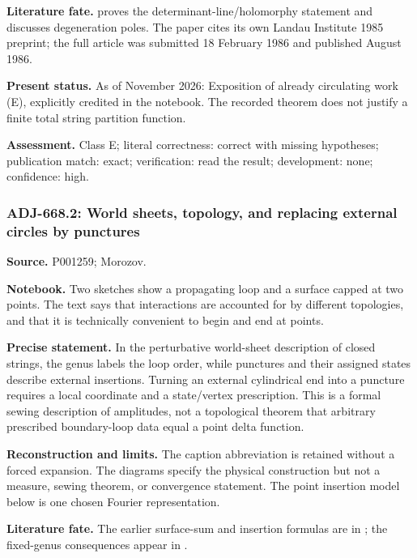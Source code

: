 \noindent\textbf{Literature fate.} \citet[\S\S2--5, especially (2.19), (3.4), and (5.1)]{belavinknizhnik1986complex} proves the determinant-line/holomorphy statement and discusses degeneration poles. The paper cites its own Landau Institute 1985 preprint; the full article was submitted 18 February 1986 and published August 1986.\par

\noindent\textbf{Present status.} As of November 2026: Exposition of already circulating work (E), explicitly credited in the notebook. The recorded theorem does not justify a finite total string partition function.\par

\noindent\textbf{Assessment.} Class E; literal correctness: correct with missing hypotheses; publication match: exact; verification: read the result; development: none; confidence: high.\par

\subsubsection{ADJ-668.2: World sheets, topology, and replacing external circles by punctures}
\noindent\textbf{Source.} P001259; Morozov.\par
\noindent\textbf{Notebook.} Two sketches show a propagating loop and a surface capped at two points. The text says that interactions are accounted for by different topologies, and that it is technically convenient to begin and end at points.\par

\noindent\textbf{Precise statement.} In the perturbative world-sheet description of closed strings, the genus labels the loop order, while punctures and their assigned states describe external insertions. Turning an external cylindrical end into a puncture requires a local coordinate and a state/vertex prescription. This is a formal sewing description of amplitudes, not a topological theorem that arbitrary prescribed boundary-loop data equal a point delta function.\par

\noindent\textbf{Reconstruction and limits.} The caption abbreviation is retained without a forced expansion. The diagrams specify the physical construction but not a measure, sewing theorem, or convergence statement. The point insertion model below is one chosen Fourier representation.\par

\noindent\textbf{Literature fate.} The earlier surface-sum and insertion formulas are in \citet[eqs.~(1)--(3),(26)--(31)]{polyakov1981quantum}; the fixed-genus consequences appear in \citet[\S6]{belavinknizhnik1986complex}.\par

